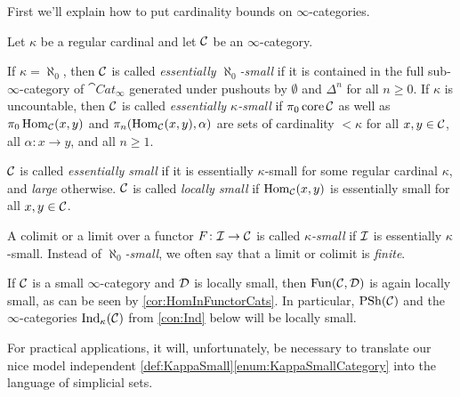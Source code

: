 First we'll explain how to put cardinality bounds on $\infty$-categories.
\begin{defi}\label{def:KappaSmall}
	Let $\kappa$ be a regular cardinal and let $\mathcal{C}$ be an $\infty$-category.
	\begin{alphanumerate}
		\item If $\kappa=\aleph_0$, then $\mathcal{C}$ is called \emph{essentially $\aleph_0$-small} if it is contained in the full sub-$\infty$-category of $\cat{Cat}_\infty$ generated under pushouts by $\emptyset$ and $\Delta^n$ for all $n\geqslant 0$. If $\kappa$ is uncountable, then $\mathcal{C}$ is called \emph{essentially $\kappa$-small} if $\pi_0\operatorname{core} \mathcal{C}$ as well as $\pi_0\operatorname{Hom}_{\mathcal{C}}(x,y)$ and $\pi_n(\operatorname{Hom}_{\mathcal{C}}(x,y),\alpha)$ are sets of cardinality $<\kappa$ for all $x,y\in\mathcal{C}$, all $\alpha\colon x\rightarrow y$, and all $n\geqslant 1$.\label{enum:KappaSmallCategory}%
		\item $\mathcal{C}$ is called \emph{essentially small} if it is essentially $\kappa$-small for some regular cardinal $\kappa$, and \emph{large} otherwise. $\mathcal{C}$ is called \emph{locally small} if $\operatorname{Hom}_{\mathcal{C}}(x,y)$ is essentially small for all $x,y\in\mathcal{C}$.\label{enum:Small}
		\item A colimit or a limit over a functor $F\colon \mathcal{I}\rightarrow \mathcal{C}$ is called \emph{$\kappa$-small} if $\mathcal{I}$ is essentially $\kappa$-small. Instead of \emph{$\aleph_0$-small}, we often say that a limit or colimit is \emph{finite}.\label{enum:KappaSmallLimit}
	\end{alphanumerate}
\end{defi}
\begin{rem}\label{rem:FunLocallySmall}
	If $\mathcal{C}$ is a small $\infty$-category and $\mathcal{D}$ is locally small, then $\operatorname{Fun}(\mathcal{C},\mathcal{D})$ is again locally small, as can be seen by \cref{cor:HomInFunctorCats}. In particular, $\operatorname{PSh}(\mathcal{C})$ and the $\infty$-categories $\mathrm{Ind}_\kappa(\mathcal{C})$ from \cref{con:Ind} below will be locally small.
\end{rem}
For practical applications, it will, unfortunately, be necessary to translate our nice model independent \cref{def:KappaSmall}\cref{enum:KappaSmallCategory} into the language of simplicial sets.
